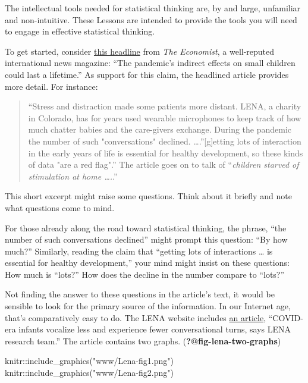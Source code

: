 \documentclass[
  letterpaper,
  DIV=11,
  numbers=noendperiod,
  oneside]{scrreprt}
\newenvironment{Shaded}{\begin{snugshade}}{\end{snugshade}}
\newcommand{\FunctionTok}[1]{\textcolor[rgb]{0.28,0.35,0.67}{#1}}
\newcommand{\NormalTok}[1]{\textcolor[rgb]{0.00,0.23,0.31}{#1}}
\newcommand{\SpecialCharTok}[1]{\textcolor[rgb]{0.37,0.37,0.37}{#1}}
\newcommand{\StringTok}[1]{\textcolor[rgb]{0.13,0.47,0.30}{#1}}
\begin{document}
The intellectual tools needed for statistical thinking are, by and
large, unfamiliar and non-intuitive. These Lessons are intended to
provide the tools you will need to engage in effective statistical
thinking.

To get started, consider
\href{https://www.economist.com/international/2022/12/15/the-pandemics-indirect-effects-on-small-children-could-last-a-lifetime}{this
headline} from \emph{The Economist}, a well-reputed international news
magazine: ``The pandemic's indirect effects on small children could last
a lifetime.'' As support for this claim, the headlined article provides
more detail. For instance:

\begin{quote}
``Stress and distraction made some patients more distant. LENA, a
charity in Colorado, has for years used wearable microphones to keep
track of how much chatter babies and the care-givers exchange. During
the pandemic the number of such "conversations" declined.
\ldots.''{[}g{]}etting lots of interaction in the early years of life is
essential for healthy development, so these kinds of data "are a red
flag".'' The article goes on to talk of ``\emph{children starved of
stimulation at home \ldots.}.''
\end{quote}

This short excerpt might raise some questions. Think about it briefly
and note what questions come to mind.

For those already along the road toward statistical thinking, the
phrase, ``the number of such conversations declined'' might prompt this
question: ``By how much?'' Similarly, reading the claim that ``getting
lots of interactions \ldots{} is essential for healthy development,''
your mind might insist on these questions: How much is ``lots?'' How
does the decline in the number compare to ``lots?''

Not finding the answer to these questions in the article's text, it
would be sensible to look for the primary source of the information. In
our Internet age, that's comparatively easy to do. The LENA website
includes
\href{https://www.lena.org/covid-infant-vocalizations-conversational-turns/}{an
article}, ``COVID-era infants vocalize less and experience fewer
conversational turns, says LENA research team.'' The article contains
two graphs. (\textbf{?@fig-lena-two-graphs})

\begin{Shaded}
\begin{Highlighting}[]
\NormalTok{knitr}\SpecialCharTok{::}\FunctionTok{include\_graphics}\NormalTok{(}\StringTok{"www/Lena{-}fig1.png"}\NormalTok{)}
\NormalTok{knitr}\SpecialCharTok{::}\FunctionTok{include\_graphics}\NormalTok{(}\StringTok{"www/Lena{-}fig2.png"}\NormalTok{)}
\end{Highlighting}
\end{Shaded}
\end{document}
